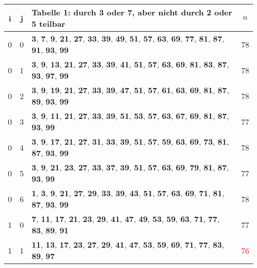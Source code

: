 \documentclass{article}
\begin{document}
\begin{tabular}{||c|c|l|c||}
	i&j&Tabelle 1: durch 3 oder 7, aber nicht durch 2 oder 5 teilbar&$n$\\
	\hline
	0&0&\textbf{3}, \textbf{7}, \textbf{9}, \textbf{21}, \textbf{27}, \textbf{33}, \textbf{39}, \textbf{49}, \textbf{51}, \textbf{57}, \textbf{63}, \textbf{69}, \textbf{77}, \textbf{81}, \textbf{87}, \textbf{91}, \textbf{93}, \textbf{99}&78\\
	0&1&\textbf{3}, \textbf{9}, \textbf{13}, \textbf{21}, \textbf{27}, \textbf{33}, \textbf{39}, \textbf{41}, \textbf{51}, \textbf{57}, \textbf{63}, \textbf{69}, \textbf{81}, \textbf{83}, \textbf{87}, \textbf{93}, \textbf{97}, \textbf{99}&78\\
	0&2&\textbf{3}, \textbf{9}, \textbf{19}, \textbf{21}, \textbf{27}, \textbf{33}, \textbf{39}, \textbf{47}, \textbf{51}, \textbf{57}, \textbf{61}, \textbf{63}, \textbf{69}, \textbf{81}, \textbf{87}, \textbf{89}, \textbf{93}, \textbf{99}&78\\
	0&3&\textbf{3}, \textbf{9}, \textbf{11}, \textbf{21}, \textbf{27}, \textbf{33}, \textbf{39}, \textbf{51}, \textbf{53}, \textbf{57}, \textbf{63}, \textbf{67}, \textbf{69}, \textbf{81}, \textbf{87}, \textbf{93}, \textbf{99}&77\\
	0&4&\textbf{3}, \textbf{9}, \textbf{17}, \textbf{21}, \textbf{27}, \textbf{31}, \textbf{33}, \textbf{39}, \textbf{51}, \textbf{57}, \textbf{59}, \textbf{63}, \textbf{69}, \textbf{73}, \textbf{81}, \textbf{87}, \textbf{93}, \textbf{99}&78\\
	0&5&\textbf{3}, \textbf{9}, \textbf{21}, \textbf{23}, \textbf{27}, \textbf{33}, \textbf{37}, \textbf{39}, \textbf{51}, \textbf{57}, \textbf{63}, \textbf{69}, \textbf{79}, \textbf{81}, \textbf{87}, \textbf{93}, \textbf{99}&77\\
	0&6&\textbf{1}, \textbf{3}, \textbf{9}, \textbf{21}, \textbf{27}, \textbf{29}, \textbf{33}, \textbf{39}, \textbf{43}, \textbf{51}, \textbf{57}, \textbf{63}, \textbf{69}, \textbf{71}, \textbf{81}, \textbf{87}, \textbf{93}, \textbf{99}&78\\
	1&0&\textbf{7}, \textbf{11}, \textbf{17}, \textbf{21}, \textbf{23}, \textbf{29}, \textbf{41}, \textbf{47}, \textbf{49}, \textbf{53}, \textbf{59}, \textbf{63}, \textbf{71}, \textbf{77}, \textbf{83}, \textbf{89}, \textbf{91}&77\\
	1&1&\textbf{11}, \textbf{13}, \textbf{17}, \textbf{23}, \textbf{27}, \textbf{29}, \textbf{41}, \textbf{47}, \textbf{53}, \textbf{59}, \textbf{69}, \textbf{71}, \textbf{77}, \textbf{83}, \textbf{89}, \textbf{97}&\textcolor{red}{76}\\

\end{tabular}
\end{document}
